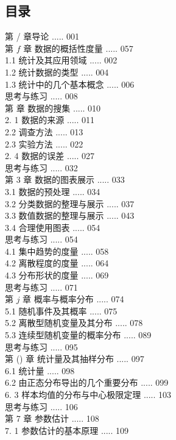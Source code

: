 \documentclass[10pt]{article}
\begin{document}
\begin{CJK*}{UTF8}{bsmi}
\section*{目录}
第 / 章导论 ..... 001\\
第 $f$ 章 数据的概括性度量 ..... 057\\
1.1 统计及其应用领域 ..... 002\\
1.2 统计数据的类型 ..... 004\\
1.3 统计中的几个基本概念 ..... 006\\
思考与练习 ..... 008\\
第 章 数据的搜集 ..... 010\\
2. 1 数据的来源 ..... 011\\
2.2 调查方法 ..... 013\\
2.3 实验方法 ..... 022\\
2. 4 数据的误差 ..... 027\\
思考与练习 ..... 032\\
第 3 章 数据的图表展示 ..... 033\\
3.1 数据的预处理 ..... 034\\
3.2 分类数据的整理与展示 ..... 037\\
3.3 数值数据的整理与展示 ..... 043\\
3.4 合理使用图表 ..... 054\\
思考与练习 ..... 054\\
4.1 集中趋势的度量 ..... 058\\
4.2 离散程度的度量 ..... 064\\
4.3 分布形状的度量 ..... 069\\
思考与练习 ..... 071\\
第 $j$ 章 概率与概率分布 ..... 074\\
5.1 随机事件及其概率 ..... 075\\
5.2 离散型随机变量及其分布 ..... 078\\
5.3 连续型随机变量的概率分布 ..... 089\\
思考与练习 ..... 095\\
第 () 章 统计量及其抽样分布 ..... 097\\
6.1 统计量 ..... 098\\
6.2 由正态分布导出的几个重要分布 ..... 099\\
6. 3 样本均值的分布与中心极限定理 ..... 103\\
思考与练习 ..... 106\\
第 7 章 参数估计 ..... 108\\
7. 1 参数估计的基本原理 ..... 109\\

\end{CJK*}
\end{document}
